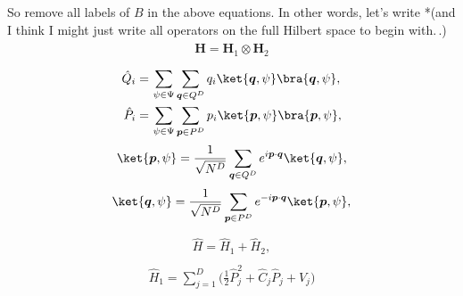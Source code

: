 \documentclass{report}
\begin{document}
So remove all labels of $B$ in the above equations. In other words, let's write *(and I think I might just write all operators on the full Hilbert space to begin with.\,.)
\begin{align}
\begin{aligned}
	\textbf{H} = \textbf{H}_1 \otimes \textbf{H}_2
\end{aligned}
\end{align} 
\begin{align}
\begin{aligned}
	\hat Q_{i} =&\, \sum_{\psi \in \Psi} \sum_{\boldsymbol{q} \in Q^D} 
		q_{i} \ket{\boldsymbol{q}, \psi} \bra{\boldsymbol{q}, \psi}, \\
	\hat P_{i} =&\, \sum_{\psi \in \Psi} \sum_{\boldsymbol{p} \in P^D} 
		p_{i} \ket{\boldsymbol{p}, \psi} \bra{\boldsymbol{p}, \psi},
\end{aligned}
\end{align} 
\begin{align}
\begin{aligned}
	\ket{\boldsymbol{p}, \psi} = \frac{1}{\sqrt{N^{D}}} \sum_{\boldsymbol{q}\in Q^D}
		e^{i \boldsymbol{p} \cdot \boldsymbol{q}} \ket{\boldsymbol{q}, \psi},
	\label{ket_p_01}
\end{aligned}
\end{align} 
\begin{align}
\begin{aligned}
	\ket{\boldsymbol{q}, \psi} = \frac{1}{\sqrt{N^{D}}} \sum_{\boldsymbol{p}\in P^D}
		e^{- i \boldsymbol{p} \cdot \boldsymbol{q}} \ket{\boldsymbol{p}, \psi},
	\label{ket_q_01}
\end{aligned}
\end{align} 
\begin{align}
\begin{aligned}
	\hat H = \hat H_{1} + \hat H_{2},
	\label{H_B_02}
\end{aligned}
\end{align}
\begin{align}
\begin{aligned}
	\hat H_{1} = 
		\sum_{j=1}^{D} \big(
			\frac{1}{2} \hat P_{j}^2 + 
			\hat C_{j} \hat P_{j} +
			\hat V_{j} 
		\big) 
%		
	\label{H_1_01}
\end{aligned}
\end{align} 
\end{document}

